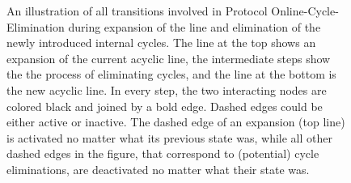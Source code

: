 \documentclass[preprint]{elsarticle}
\begin{document}
\begin{figure}[!hbtp]
\caption{An illustration of all transitions involved in Protocol Online-Cycle-Elimination during expansion of the line and elimination of the newly introduced internal cycles. The line at the top shows an expansion of the current acyclic line, the intermediate steps show the the process of eliminating cycles, and the line at the bottom is the new acyclic line. In every step, the two interacting nodes are colored black and joined by a bold edge. Dashed edges could be either active or inactive. The dashed edge of an expansion (top line) is activated no matter what its previous state was, while all other dashed edges in the figure, that correspond to (potential) cycle eliminations, are deactivated no matter what their state was.} \label{fig:cycle-elimination}
\end{figure}
\end{document}
